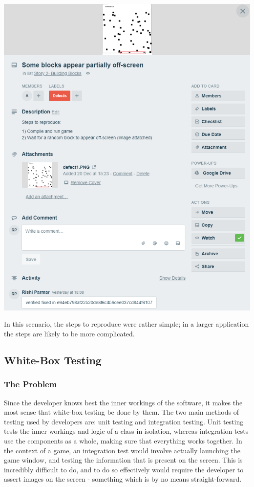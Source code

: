 \documentclass[12pt]{article}
\begin{document}
\begin{center}
    \includegraphics[scale=0.5]{images/defect.png}
\end{center}

In this scenario, the steps to reproduce were rather simple; in a larger application the steps are likely to be more complicated.

\subsection{White-Box Testing}

\subsubsection{The Problem}

Since the developer knows best the inner workings of the software, it makes the most sense that white-box testing be done by them. The two main methods of testing used by developers are: unit testing and integration testing. Unit testing tests the inner-workings and logic of a class in isolation, whereas integration tests use the components as a whole, making sure that everything works together. In the context of a game, an integration test would involve actually launching the game window, and testing the information that is present on the screen. This is incredibly difficult to do, and to do so effectively would require the developer to assert images on the screen - something which is by no means straight-forward. \\
\end{document}
